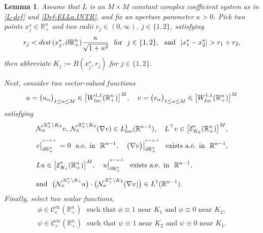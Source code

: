 \documentclass[10pt,a4paper]{amsart}
\newtheorem{lemma}{Lemma}
\begin{document}
\begin{lemma}\label{Lgav-TeD}
Assume that $L$ is an $M\times M$ constant complex coefficient system as in \eqref{L-def} and \eqref{Def-ELLa.INTR}, 
and fix an aperture parameter $\kappa>0$. Pick two points $x^\star_j\in{\mathbb{R}}^{n}_{+}$ 
and two radii $r_j\in(0,\infty)$, $j\in\{1,2\}$, satisfying 
%
\begin{equation}\label{CPTs}
r_j<{\rm dist}\,(x^\star_j,\partial{\mathbb{R}}^n_{+})\frac{\kappa}{\sqrt{1+\kappa^2}}
\,\,\text{ for }\,\,j\in\{1,2\},\,\,\text{ and }\,\,|x^\star_1-x^\star_2|>r_1+r_2, 
\end{equation}
%
then abbreviate $K_j:=\overline{B(x^\star_j,r_j)}$ for $j\in\{1,2\}$.

Next, consider two vector-valued functions
%
\begin{equation}\label{Tvav-TREINRv}
u=\big(u_{\alpha}\big)_{1\leq\alpha\leq M}\in\big[W^{1,1}_{\rm loc}({\mathbb{R}}^n_{+})\big]^M,\quad
v=\big(v_{\alpha}\big)_{1\leq\alpha\leq M}\in\big[W^{1,1}_{\rm loc}({\mathbb{R}}^n_{+})\big]^M
\end{equation}
%
satisfying 
%
\begin{align}\label{hBbac.1}
& {\mathcal{N}}_\kappa^{\,\mathbb{R}^{n}_{+}\setminus K_2}v,\,
{\mathcal{N}}_\kappa^{\,\mathbb{R}^{n}_{+}\setminus K_2}(\nabla v)\in L^1_{\rm loc}({\mathbb{R}}^{n-1}),\quad
L^{\top}v\in\big[{\mathcal{E}}'_{K_2}(\mathbb{R}^{n}_{+})\big]^M,
\\[4pt]
& v\big|^{{}^{\kappa-{\rm n.t.}}}_{\partial{\mathbb{R}}^n_{+}}=0
\,\,\text{ a.e. in }\,\,{\mathbb{R}}^{n-1},\quad
\big(\nabla v\big)\big|_{\partial\mathbb{R}^{n}_{+}}^{{}^{\kappa-{\rm n.t.}}}
\,\,\text{ exists a.e. in }\,\,{\mathbb{R}}^{n-1},
\label{hBbac.2}
\\[4pt]
\label{DiBBa.LLap}
& Lu\in\big[{\mathcal{E}}'_{K_1}(\mathbb{R}^{n}_{+})\big]^M,\quad
u\big|_{\partial\mathbb{R}^{n}_{+}}^{{}^{\kappa-{\rm n.t.}}}\,\,\text{ exists a.e. in }\,\,{\mathbb{R}}^{n-1},
\\[4pt]
& \text{and }\,\,
\big({\mathcal{N}}^{\,\mathbb{R}^{n}_{+}\setminus K_1}_\kappa u\big)\cdot
\big({\mathcal{N}}_\kappa^{\,\mathbb{R}^{n}_{+}\setminus K_2}(\nabla v)\big)\in L^1({\mathbb{R}}^{n-1}).
\label{DiBBa.LLap.BBBB}
\end{align}
%
Finally, select two scalar functions, 
%
\begin{equation}\label{Ua-eNBVVatGG}
\begin{array}{c}
\phi\in{\mathscr{C}}^\infty_c({\mathbb{R}}^n_{+})
\,\,\text{ such that $\phi\equiv 1$ near $K_1$ and $\phi\equiv 0$ near $K_2$},
\\[6pt]
\psi\in{\mathscr{C}}^\infty_c({\mathbb{R}}^n_{+})
\,\,\text{ such that $\psi\equiv 1$ near $K_2$ and $\psi\equiv 0$ near $K_1$}.
\end{array}
\end{equation}


\end{lemma}
\end{document}
